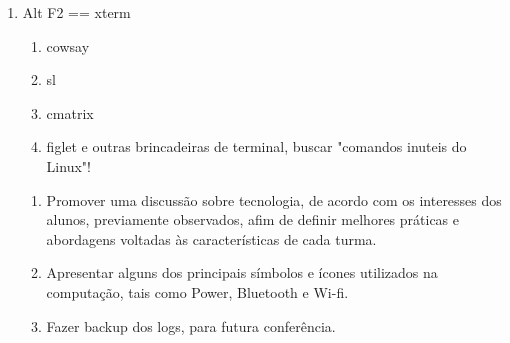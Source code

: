 \begin{enumerate}
	\item Alt F2 == xterm
	\begin{enumerate}
		\item cowsay
		\item sl
		\item cmatrix
		\item figlet e outras brincadeiras de terminal, buscar "comandos inuteis do Linux"!
	\end{enumerate}
	
	\begin{enumerate}
	\item Promover uma discussão sobre tecnologia, de acordo com os interesses dos alunos, previamente observados, afim de definir melhores práticas e abordagens voltadas às características de cada turma.
	\item Apresentar alguns dos principais símbolos e ícones utilizados na computação, tais como Power, Bluetooth e Wi-fi.
	\item Fazer backup dos logs, para futura conferência.
\end{enumerate}
\end{enumerate}
